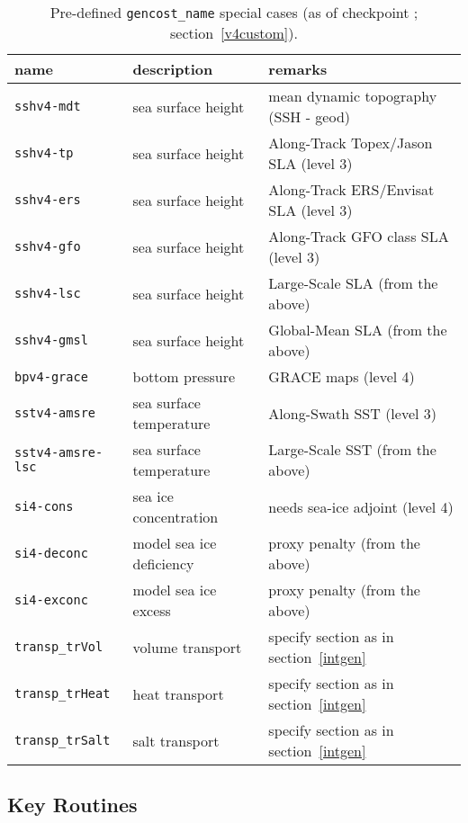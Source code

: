 \begin{table}[!ht]
\centering
\begin{tabular}{lll}
name					&	description				&	remarks \\ \hline\hline
\texttt{sshv4-mdt}			&	sea surface height			&	mean dynamic topography (SSH - geod) \\
\texttt{sshv4-tp}				&	sea surface height			&	Along-Track Topex/Jason SLA (level 3) \\
\texttt{sshv4-ers}			&	sea surface height			&	Along-Track ERS/Envisat SLA (level 3)\\
\texttt{sshv4-gfo}			&	sea surface height			&	Along-Track GFO class SLA (level 3)\\
\texttt{sshv4-lsc}			&	sea surface height			&	Large-Scale SLA (from the above)\\
\texttt{sshv4-gmsl}			&	sea surface height			&	Global-Mean SLA (from the above)\\ \hline
\texttt{bpv4-grace}			&	bottom pressure			&	GRACE maps (level 4) \\ \hline
\texttt{sstv4-amsre}			&	sea surface temperature		&	Along-Swath SST (level 3)\\
\texttt{sstv4-amsre-lsc}		&	sea surface temperature		&	Large-Scale SST (from the above)\\ \hline
\texttt{si4-cons}				&	sea ice concentration		& 	needs sea-ice adjoint (level 4)\\
\texttt{si4-deconc}			&	model sea ice deficiency		& 	proxy penalty (from the above)\\
\texttt{si4-exconc}			&	model sea ice excess		& 	proxy penalty (from the above)\\ \hline
\texttt{transp\_trVol}			&	volume transport			& specify section as in section~\ref{intgen}\\ 
\texttt{transp\_trHeat}		&	heat transport				& specify section as in section~\ref{intgen} \\ 
\texttt{transp\_trSalt}			&	salt transport				& specify section as in section~\ref{intgen} \\ 
\end{tabular}
\caption{Pre-defined \texttt{gencost\_name} special cases (as of checkpoint \mitgcmCheckpointVersion; section~\ref{v4custom}).}
\label{tbl:gencost_ecco_name}
\end{table}

\subsection{Key Routines}

